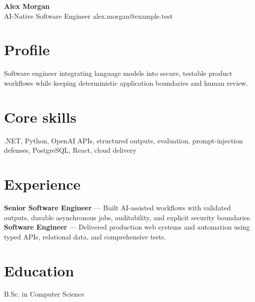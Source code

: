 \documentclass[10pt]{article}
\begin{document}
{\LARGE\textbf{Alex Morgan}}\\
AI-Native Software Engineer \hfill alex.morgan@example.test

\section*{Profile}
Software engineer integrating language models into secure, testable product workflows while keeping deterministic application boundaries and human review.

\section*{Core skills}
.NET, Python, OpenAI APIs, structured outputs, evaluation, prompt-injection defenses, PostgreSQL, React, cloud delivery

\section*{Experience}
\textbf{Senior Software Engineer} --- Built AI-assisted workflows with validated outputs, durable asynchronous jobs, auditability, and explicit security boundaries.\\[4pt]
\textbf{Software Engineer} --- Delivered production web systems and automation using typed APIs, relational data, and comprehensive tests.

\section*{Education}
B.Sc. in Computer Science
\end{document}
